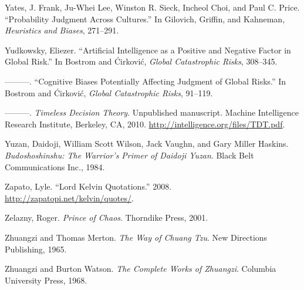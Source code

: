 {
 Yates, J. Frank, Ju-Whei Lee, Winston R. Sieck, Incheol Choi, and
Paul C. Price. ``Probability Judgment Across
Cultures.'' In Gilovich, Griffin, and Kahneman,
\textit{Heuristics and Biases}, 271--291.}

{
 Yudkowsky, Eliezer. ``Artificial Intelligence as
a Positive and Negative Factor in Global Risk.'' In
Bostrom and \'Cirkovi\'c, \textit{Global Catastrophic Risks},
308--345.}

{
 {}---{}---{}---. ``Cognitive Biases Potentially
Affecting Judgment of Global Risks.'' In Bostrom and
\'Cirkovi\'c, \textit{Global Catastrophic Risks}, 91--119.}

{
 {}---{}---{}---. \textit{Timeless Decision Theory}. Unpublished
manuscript. Machine Intelligence Research Institute, Berkeley, CA,
2010. \url{http://intelligence.org/files/TDT.pdf}.}

{
 Yuzan, Daidoji, William Scott Wilson, Jack Vaughn, and Gary Miller
Haskins. \textit{Budoshoshinshu: The Warrior's Primer
of Daidoji Yuzan}. Black Belt Communications Inc., 1984.}

{
 Zapato, Lyle. ``Lord Kelvin
Quotations.'' 2008.
\url{http://zapatopi.net/kelvin/quotes/}.}

{
 Zelazny, Roger. \textit{Prince of Chaos}. Thorndike Press, 2001.}

{
 Zhuangzi and Thomas Merton. \textit{The Way of Chuang Tzu}. New
Directions Publishing, 1965.}

{
 Zhuangzi and Burton Watson. \textit{The Complete Works of
Zhuangzi}. Columbia University Press, 1968.}


\bigskip


\bigskip

\clearpage
\bigskip
